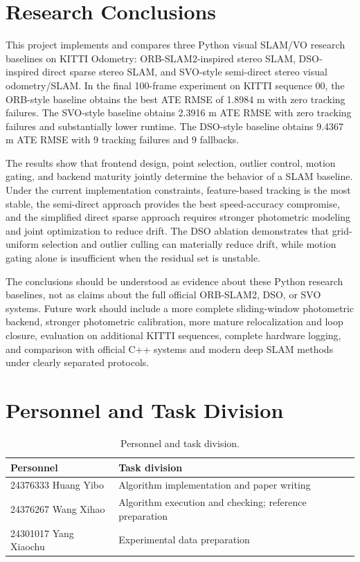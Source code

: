 \documentclass[11pt,a4paper]{article}
\newcommand{\methodorb}{ORB-SLAM2-inspired stereo SLAM}
\newcommand{\methoddso}{DSO-inspired direct sparse stereo SLAM}
\newcommand{\methodsvo}{SVO-style semi-direct stereo visual odometry/SLAM}
\begin{document}
\section{Research Conclusions}

This project implements and compares three Python visual SLAM/VO research baselines on KITTI Odometry: \methodorb{}, \methoddso{}, and \methodsvo{}. In the final 100-frame experiment on KITTI sequence 00, the ORB-style baseline obtains the best ATE RMSE of 1.8984 m with zero tracking failures. The SVO-style baseline obtains 2.3916 m ATE RMSE with zero tracking failures and substantially lower runtime. The DSO-style baseline obtains 9.4367 m ATE RMSE with 9 tracking failures and 9 fallbacks.

The results show that frontend design, point selection, outlier control, motion gating, and backend maturity jointly determine the behavior of a SLAM baseline. Under the current implementation constraints, feature-based tracking is the most stable, the semi-direct approach provides the best speed-accuracy compromise, and the simplified direct sparse approach requires stronger photometric modeling and joint optimization to reduce drift. The DSO ablation demonstrates that grid-uniform selection and outlier culling can materially reduce drift, while motion gating alone is insufficient when the residual set is unstable.

The conclusions should be understood as evidence about these Python research baselines, not as claims about the full official ORB-SLAM2, DSO, or SVO systems. Future work should include a more complete sliding-window photometric backend, stronger photometric calibration, more mature relocalization and loop closure, evaluation on additional KITTI sequences, complete hardware logging, and comparison with official C++ systems and modern deep SLAM methods under clearly separated protocols.

\section{Personnel and Task Division}

\begin{table}[H]
\centering
\caption{Personnel and task division.}
\label{tab:division}
\begin{tabular}{ll}
\toprule
Personnel & Task division \\
\midrule
24376333 Huang Yibo & Algorithm implementation and paper writing \\
24376267 Wang Xihao & Algorithm execution and checking; reference preparation \\
24301017 Yang Xiaochu & Experimental data preparation \\
\bottomrule
\end{tabular}
\end{table}



\end{document}
